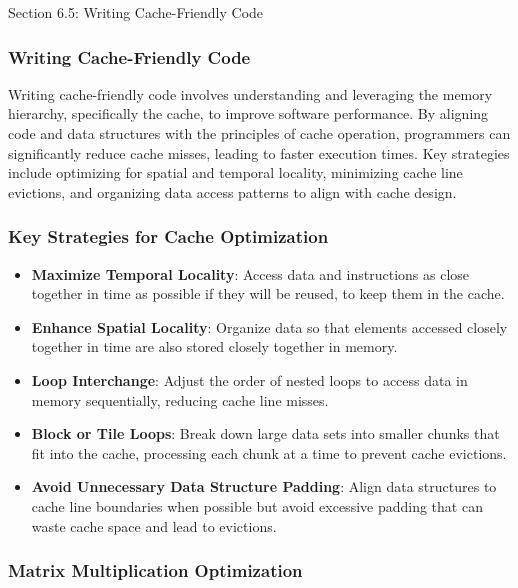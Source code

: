 \begin{notes}{Section 6.5: Writing Cache-Friendly Code}
    \subsubsection*{Writing Cache-Friendly Code}

    Writing cache-friendly code involves understanding and leveraging the memory hierarchy, specifically the cache, to improve software performance. By aligning code and data structures with the principles 
    of cache operation, programmers can significantly reduce cache misses, leading to faster execution times. Key strategies include optimizing for spatial and temporal locality, minimizing cache line 
    evictions, and organizing data access patterns to align with cache design. \vspace*{1em}
    
    \subsubsection*{Key Strategies for Cache Optimization}
    
    \begin{itemize}
        \item \textbf{Maximize Temporal Locality}: Access data and instructions as close together in time as possible if they will be reused, to keep them in the cache.
        \item \textbf{Enhance Spatial Locality}: Organize data so that elements accessed closely together in time are also stored closely together in memory.
        \item \textbf{Loop Interchange}: Adjust the order of nested loops to access data in memory sequentially, reducing cache line misses.
        \item \textbf{Block or Tile Loops}: Break down large data sets into smaller chunks that fit into the cache, processing each chunk at a time to prevent cache evictions.
        \item \textbf{Avoid Unnecessary Data Structure Padding}: Align data structures to cache line boundaries when possible but avoid excessive padding that can waste cache space and lead to evictions.
    \end{itemize}
    
    \begin{highlight}
        \subsubsection*{Matrix Multiplication Optimization}
    

\end{highlight}
\end{notes}
